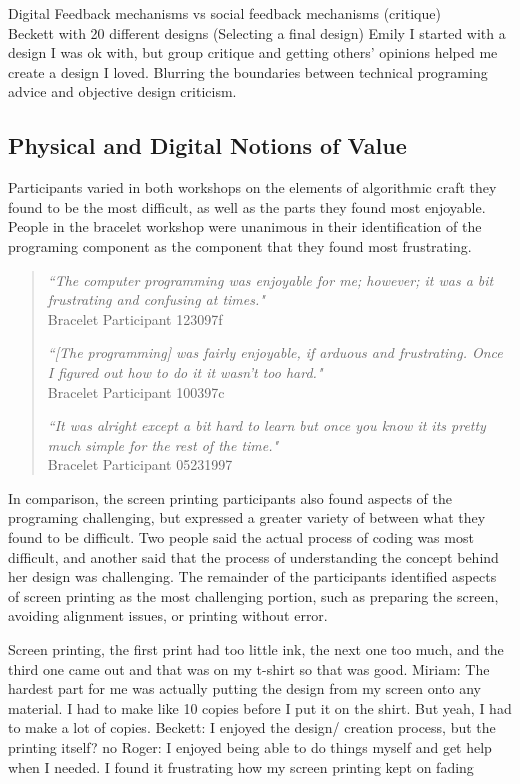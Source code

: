 \documentclass{sigchi}
\begin{document}
Digital Feedback mechanisms vs social feedback mechanisms (critique)\\
Beckett with 20 different designs (Selecting a final design)
Emily I started with a design I was ok with, but group critique and getting others' opinions helped me create a design I loved.
Blurring the boundaries between technical programing advice and objective design criticism.

\subsection{Physical and Digital Notions of Value}
Participants varied in both workshops on the elements of algorithmic craft they found to be the most difficult, as well as the parts they found most enjoyable. People in the bracelet workshop were unanimous in their identification of the programing component as the component that they found most frustrating.
 \begin{quotation}
\textit{``The computer programming was enjoyable for me; however; it was a bit frustrating and confusing at times."}
\\Bracelet Participant 123097f

\textit{``[The programming] was fairly enjoyable, if arduous and frustrating. Once I figured out how to do it it wasn't too hard."}
\\Bracelet Participant 100397c

\textit{``It was alright except a bit hard to learn but once you know it its pretty much simple for the rest of the time."}
\\Bracelet Participant 05231997
\end{quotation}
In comparison, the screen printing participants also found aspects of the programing challenging, but expressed a greater variety of between what they found to be difficult. Two people said the actual process of coding was most difficult, and another said that the process of understanding the concept behind her design was challenging. The remainder of the participants identified aspects of screen printing as the most challenging portion, such as preparing the screen, avoiding alignment issues, or printing without error.

Screen printing, the first print had too little ink, the next one too much, and the third one came out and that was on my t-shirt so that was good.
Miriam: The hardest part for me was actually putting the design from my screen onto any material. I had to make like 10 copies before I put it on the shirt. But yeah, I had to make a lot of copies. 
Beckett: I enjoyed the design/ creation process, but the printing itself? no
Roger: I enjoyed being able to do things myself and get help when I needed. I found it frustrating how my screen printing kept on fading
\end{document}
